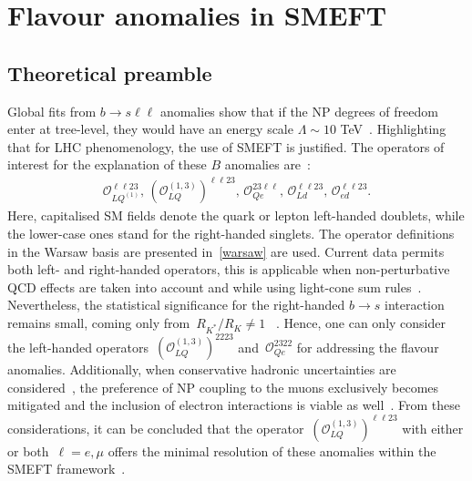 \section{Flavour anomalies in SMEFT }
\label{sec:theory}
\subsection{Theoretical preamble}
\par Global fits from $ b \to s \ell \ell$ anomalies show that if the NP degrees of freedom enter at tree-level, they would have an energy scale $ \Lambda \sim 10$ TeV~\cite{DAmico:2017mtc,Geng:2017svp,Capdevila:2017bsm,Ciuchini:2017mik,Hiller:2017bzc}. Highlighting that for LHC phenomenology, the use of SMEFT is justified.  The operators of interest for the explanation of these $B$ anomalies are~\cite{Celis:2017doq,Ciuchini:2019usw,Aebischer:2019mlg}: 
\begin{eqnarray}
	\label{eq:tree_LUV_SMEFT}
	\mathcal{O}_{LQ^{(1)}}^{\ell \ell 23}, \,	(\mathcal{O}_{LQ}^{(1,3)})^{\ell \ell 23}, \, \mathcal{O}_{Qe}^{23 \ell \ell}, \,  \mathcal{O}_{Ld}^{ \ell \ell 23}, \, \mathcal{O}_{ed}^{\ell \ell 23 }.
\end{eqnarray}
Here, capitalised SM fields denote the quark or lepton left-handed doublets, while the lower-case ones stand for the right-handed singlets.  The operator definitions in the Warsaw basis are presented in~\autoref{warsaw} are used.  Current data permits  both left- and right-handed operators, this is applicable when non-perturbative QCD effects are taken into account and while using light-cone sum rules~\cite{Ciuchini:2019usw,Alok:2019ufo,Alguero:2019ptt,Kowalska:2019ley}. Nevertheless, the statistical significance for the right-handed $b \to s$ interaction remains small, coming only from~$R_{K^{*}}/R_{K} \neq 1$ ~\cite{Hiller:2017bzc,Ciuchini:2019usw}. Hence, one can only consider the left-handed operators~$(	\mathcal{O}_{LQ}^{(1,3)} )^{22 23}$ and~$\mathcal{O}_{Qe}^{23 22}$ for addressing the flavour anomalies. Additionally, when conservative hadronic uncertainties are considered~\cite{Jager:2014rwa,Ciuchini:2015qxb,Arbey:2018ics}, the preference of NP coupling to the muons exclusively becomes mitigated and the inclusion of electron interactions is viable as well~\cite{Ciuchini:2017mik}. From these considerations, it can be concluded that the operator~$(\mathcal{O}_{LQ}^{(1,3)} )^{\ell \ell 23}$ with either or both~$ \ell=e, \mu$  offers the minimal resolution of these anomalies within the SMEFT framework~\cite{Ciuchini:2019usw}.
